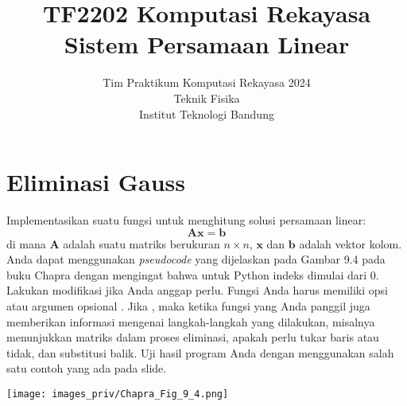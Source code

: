 



\title{%
{\small TF2202 Komputasi Rekayasa}\\
Sistem Persamaan Linear
}
\author{Tim Praktikum Komputasi Rekayasa 2024\\
Teknik Fisika\\
Institut Teknologi Bandung}
\date{}
\maketitle


\section{Eliminasi Gauss}

\begin{soal}
Implementasikan suatu fungsi untuk menghitung solusi persamaan linear:
\begin{equation*}
\mathbf{A}\mathbf{x} = \mathbf{b}
\end{equation*}
di mana $\mathbf{A}$ adalah suatu matriks berukuran $n \times n$, 
$\mathbf{x}$ dan $\mathbf{b}$ adalah vektor kolom.
Anda dapat menggunakan \textit{pseudocode} yang dijelaskan pada Gambar 9.4
pada buku Chapra dengan mengingat bahwa untuk Python indeks dimulai dari 0.
Lakukan modifikasi jika Anda anggap perlu.
Fungsi Anda harus memiliki opsi atau argumen opsional .
Jika , maka ketika fungsi yang Anda panggil juga
memberikan informasi mengenai langkah-langkah yang dilakukan, misalnya
menunjukkan matriks dalam proses eliminasi, apakah perlu tukar baris atau tidak,
dan substitusi balik. Uji hasil program Anda dengan menggunakan salah satu contoh
yang ada pada slide.
\end{soal}

{\centering
\texttt{[image: images\_priv/Chapra\_Fig\_9\_4.png]}
\par}


